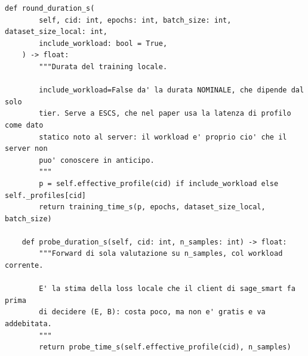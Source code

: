 \documentclass[11pt,a4paper]{article}
\begin{document}
\begin{lstlisting}[style=py,firstnumber=332,caption={\texttt{tesifl/device/world\_state.py}, lines 332--352}]
    def round_duration_s(
        self, cid: int, epochs: int, batch_size: int, dataset_size_local: int,
        include_workload: bool = True,
    ) -> float:
        """Durata del training locale.

        include_workload=False da' la durata NOMINALE, che dipende dal solo
        tier. Serve a ESCS, che nel paper usa la latenza di profilo come dato
        statico noto al server: il workload e' proprio cio' che il server non
        puo' conoscere in anticipo.
        """
        p = self.effective_profile(cid) if include_workload else self._profiles[cid]
        return training_time_s(p, epochs, dataset_size_local, batch_size)

    def probe_duration_s(self, cid: int, n_samples: int) -> float:
        """Forward di sola valutazione su n_samples, col workload corrente.

        E' la stima della loss locale che il client di sage_smart fa prima
        di decidere (E, B): costa poco, ma non e' gratis e va addebitata.
        """
        return probe_time_s(self.effective_profile(cid), n_samples)
\end{lstlisting}
\end{document}
